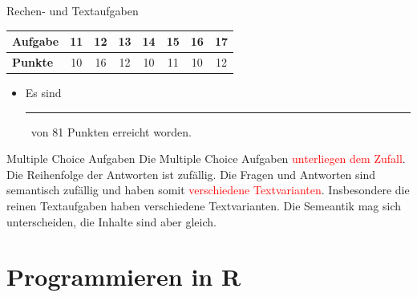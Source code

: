 \documentclass[a4paper, 9pt]{scrartcl}\usepackage[]{graphicx}\usepackage[]{xcolor}
\begin{document}
\begin{graybox}{Rechen- und Textaufgaben}
  \begin{center}
    \large
    \begin{tabular}{|l|c|c|c|c|c|c|c|}
      \hline
      \textbf{Aufgabe} & \textbf{11} & \textbf{12} & \textbf{13} & \textbf{14} & \textbf{15} & \textbf{16} & \textbf{17} \strut\\
      \hline
      \textbf{Punkte} & 
      \hspace{1Ex}\Large\textcolor{gray!70}{10}\hspace{1Ex}  & 
      \hspace{1Ex}\Large\textcolor{gray!70}{16}\hspace{1Ex}  & 
      \hspace{1Ex}\Large\textcolor{gray!70}{12}\hspace{1Ex}  & 
      \hspace{1Ex}\Large\textcolor{gray!70}{10}\hspace{1Ex}  & 
      \hspace{1Ex}\Large\textcolor{gray!70}{11}\hspace{1Ex}  & 
      \hspace{1Ex}\Large\textcolor{gray!70}{10}\hspace{1Ex}  & 
      \hspace{1Ex}\Large\textcolor{gray!70}{12}\hspace{1Ex} \strut\\
      \hline
  \end{tabular}
\end{center}
\begin{itemize}
\item Es sind \rule[0ex]{2em}{.4pt}\, von 81 Punkten erreicht worden.
\end{itemize}
\end{graybox}

\clearpage
\begin{graybox}{Multiple Choice Aufgaben}
Die Multiple Choice Aufgaben \textcolor{red}{unterliegen dem Zufall}. Die Reihenfolge der Antworten ist zufällig. Die Fragen und Antworten sind semantisch zufällig und haben somit \textcolor{red}{verschiedene Textvarianten}. Insbesondere die reinen Textaufgaben haben verschiedene Textvarianten. Die Semeantik mag sich unterscheiden, die Inhalte sind aber gleich.
\end{graybox}
\section*{Programmieren in R} 
\end{document}
